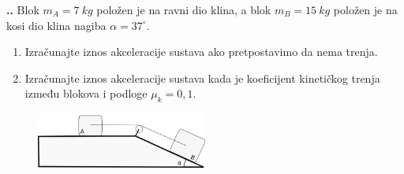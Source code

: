 

\noindent 
\textbf{
\thecjelina.\thezadatak.}
Blok $m_A = 7\ kg$ položen je na ravni dio klina, a blok $m_B = 15\ kg$ polo\v{z}en je na kosi dio
klina nagiba $\alpha = 37^\circ$.
\begin{enumerate}[label=\alph*)]
 \item Izra\v{c}unajte iznos akceleracije sustava ako pretpostavimo da nema trenja.
 \item Izra\v{c}unajte iznos akceleracije sustava kada je koeficijent kineti\v{c}kog trenja između
blokova i podloge \(\mu_k = 0,1\).
\end{enumerate}
\begin{figure}[h]%
  \begin{center}
    \includegraphics[width=0.5\textwidth]{03_Dinamika_materijalne_tocke/stol_i_kosina.png}
  \end{center}
\end{figure}

